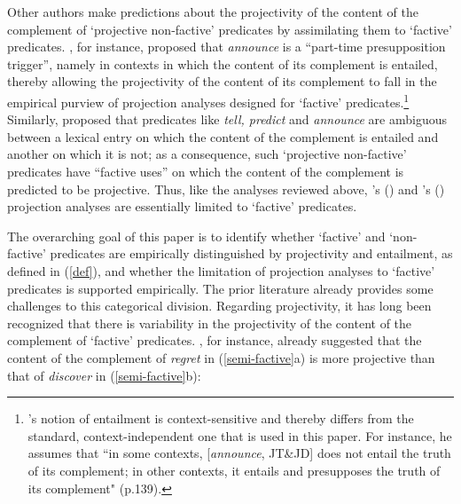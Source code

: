 \documentclass[11pt,fleqn]{article}
\newcommand{\6}{\mbox{$[\hspace*{-.6mm}[$}}
\newcommand{\9}{\mbox{$]\hspace*{-.6mm}]$}}
\newcommand{\citepos}[1]{\citeauthor{#1}'s \citeyear{#1}}
\newcommand{\citetpos}[1]{\citeauthor{#1}'s (\citeyear{#1})}
\begin{document}
Other authors make predictions about the projectivity of the content of the complement of `projective non-factive' predicates by assimilating them to `factive' predicates. \citet[139]{schlenker10}, for instance, proposed that {\em announce} is a ``part-time presupposition trigger'', namely in contexts in which the content of its complement is entailed, thereby allowing the projectivity of the content of its complement to fall in the empirical purview of projection analyses designed for `factive' predicates.\footnote{\citepos{schlenker10} notion of entailment is context-sensitive and thereby differs from the standard, context-independent one that is used in this paper. For instance, he assumes that ``in some contexts, [{\em announce}, JT\&JD] does not entail the truth of its complement; in other contexts, it entails and presupposes the truth of its complement" (p.139).}  Similarly, \citet[1736]{spector-egre2015} proposed that predicates like {\em tell, predict} and {\em announce}  are ambiguous between a lexical entry on which the content of the complement is entailed and another on which it is not; as a consequence, such `projective non-factive' predicates have ``factive uses'' on which the content of the complement is predicted to be projective. Thus, like the analyses reviewed above, \citetpos{schlenker10} and \citetpos{spector-egre2015} projection analyses are essentially limited to `factive' predicates.

The overarching goal of this paper is to identify whether `factive'  and `non-factive' predicates are empirically distinguished by projectivity and entailment, as defined in (\ref{def}), and whether the limitation of projection analyses to `factive' predicates is supported empirically. The prior literature already provides some challenges to this categorical division. Regarding projectivity, it has long been recognized that there is variability in the projectivity of the content of the complement of `factive' predicates. \citet{karttunen71b}, for instance, already suggested that the content of the complement of {\em regret} in (\ref{semi-factive}a) is more projective than that of {\em discover} in (\ref{semi-factive}b): 
\end{document}
